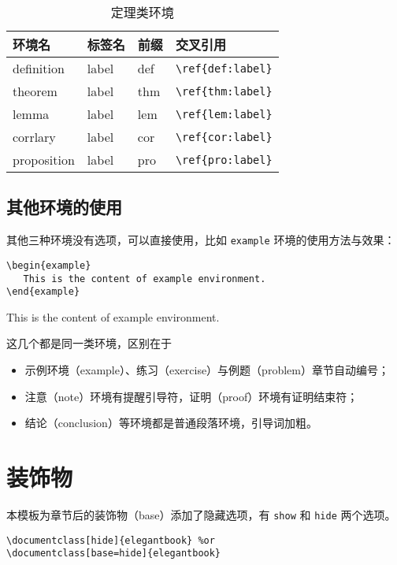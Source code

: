 \documentclass[cn,11pt]{elegantbook}
\begin{document}
\begin{table}[htbp]
   \centering
   \caption{定理类环境}
     \begin{tabular}{llll}
     \toprule
     环境名 & 标签名 & 前缀 & 交叉引用 \\
     \midrule
     definition & label & def   & \lstinline|\ref{def:label}| \\
     theorem & label & thm   & \lstinline|\ref{thm:label}| \\
     lemma & label & lem   & \lstinline|\ref{lem:label}| \\
     corrlary & label & cor   & \lstinline|\ref{cor:label}| \\
     proposition & label & pro   & \lstinline|\ref{pro:label}| \\
     \bottomrule
     \end{tabular}%
   \label{tab:theorem-class}%
 \end{table}%
 

\subsection{其他环境的使用}
其他三种环境没有选项，可以直接使用，比如 \lstinline{example} 环境的使用方法与效果：
\begin{lstlisting}
\begin{example}
   This is the content of example environment.
\end{example}
\end{lstlisting}

\begin{example}
This is the content of example environment.
\end{example}


这几个都是同一类环境，区别在于

\begin{itemize}
   \item 示例环境（example）、练习（exercise）与例题（problem）章节自动编号；
   \item 注意（note）环境有提醒引导符，证明（proof）环境有证明结束符；
   \item 结论（conclusion）等环境都是普通段落环境，引导词加粗。
\end{itemize}

\section{装饰物}

本模板为章节后的装饰物（base）添加了隐藏选项，有 \lstinline{show} 和 \lstinline{hide} 两个选项。
\begin{lstlisting}
\documentclass[hide]{elegantbook} %or
\documentclass[base=hide]{elegantbook}
\end{lstlisting}
\end{document}
